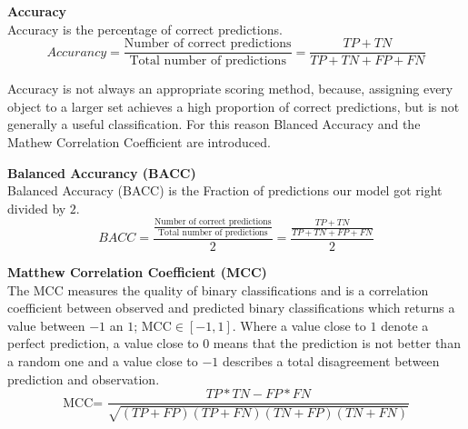 


\begin{defn}\textbf{Accuracy\\}
Accuracy is the percentage of correct predictions.
\begin{equation}
Accurancy=\frac{\text{Number of correct predictions}}{\text{Total number of predictions}}= \frac{TP+TN}{TP+TN+FP+FN}
\end{equation}
\end{defn}

Accuracy is not always an appropriate scoring method, because, assigning every object to a larger set achieves a high proportion of correct predictions, but is not generally a useful classification. For this reason Blanced Accuracy and the Mathew Correlation Coefficient are introduced.

\begin{defn}\textbf{Balanced Accurancy (BACC)}\\
Balanced Accuracy (BACC) is the Fraction of predictions our model got right divided by $2$.
\begin{equation}
BACC=\frac{\frac{\text{Number of correct predictions}}{\text{Total number of predictions}}}{2}= \frac{\frac{TP+TN}{TP+TN+FP+FN}}{2}
\end{equation}
\end{defn}

\begin{defn}\textbf{Matthew Correlation Coefficient (MCC)} \\
The MCC measures the quality of binary classifications and is a correlation coefficient between observed and predicted binary classifications which returns a value between $-1$ an $1$; $\text{MCC}\in [-1,1]$. Where a value close to $1$ denote a perfect prediction, a value close to $0$ means that the prediction is not better than a random one and a value close to $-1$ describes a total disagreement between prediction and observation.
\begin{equation}
\text{MCC= }\frac{TP*TN-FP*FN}{\sqrt{(TP+FP)(TP+FN)(TN+FP)(TN+FN)}}
\end{equation}
\end{defn}



